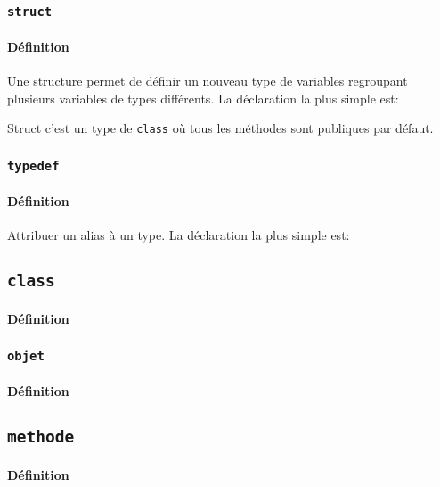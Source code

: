 \documentclass{article}
\begin{document}
\subsubsection{\texttt{struct}}
\paragraph{Définition}Une structure permet de définir un nouveau type de variables regroupant plusieurs variables de types différents. La déclaration la plus simple est:
\begin{scriptsize}
    \mycode
\end{scriptsize}
Struct c'est un type de \texttt{class} où tous les méthodes sont publiques par défaut.

\subsubsection{\texttt{typedef}}
\paragraph{Définition}Attribuer un alias à un type. La déclaration la plus simple est:
\begin{scriptsize}
    \mycode
\end{scriptsize}

\subsection{\texttt{class}}
\paragraph{Définition}

\subsubsection{\texttt{objet}}
\paragraph{Définition}

\subsection{\texttt{methode}}
\paragraph{Définition}
\end{document}
